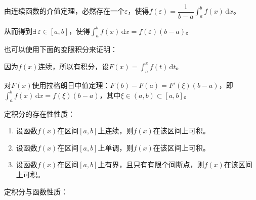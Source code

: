 \documentclass[UTF8, 12pt]{ctexart}
\begin{document}
由连续函数的介值定理，必然存在一个$\varepsilon$，使得$f(\varepsilon)=\dfrac{1}{b-a}\int_a^bf(x)\,\textrm{d}x$。

从而得到$\exists\,\varepsilon\in[a,b]$，使得$\int_a^bf(x)\,\textrm{d}x=f(\varepsilon)(b-a)$。

也可以使用下面的变限积分来证明：

因为$f(x)$连续，所以有积分，设$F(x)=\int_a^xf(t)\,\textrm{d}t$。

对$F(x)$使用拉格朗日中值定理：$F(b)-F(a)=F'(\xi)(b-a)$，即$\int_a^bf(x)\,\textrm{d}x=f(\xi)(b-a)$，其中$\xi\in(a,b)\subset[a,b]$。

定积分的存在性性质：

\begin{enumerate}
    \item 设函数$f(x)$在区间$[a,b]$上连续，则$f(x)$在该区间上可积。
    \item 设函数$f(x)$在区间$[a,b]$上单调，则$f(x)$在该区间上可积。
    \item 设函数$f(x)$在区间$[a,b]$上有界，且只有有限个间断点，则$f(x)$在该区间上可积。
\end{enumerate}

定积分与函数性质：
\end{document}
